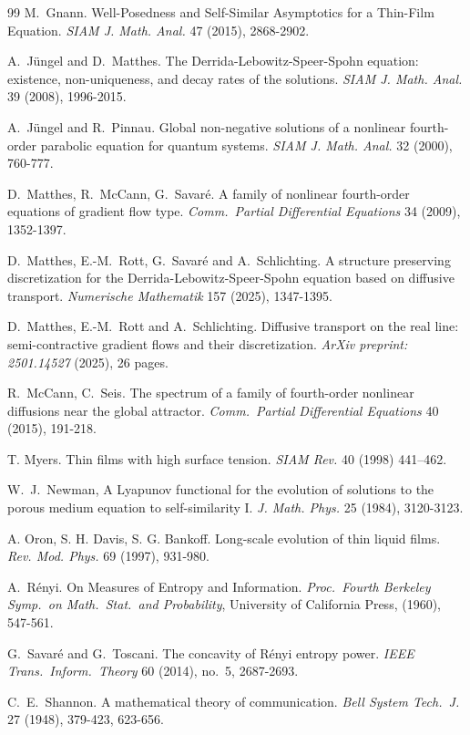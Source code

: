 \documentclass[12pt]{amsart}
\theoremstyle{plain}
\theoremstyle{definition}
\theoremstyle{remark}
\begin{document}
\begin{thebibliography}{99}
 M.~Gnann. Well-Posedness and Self-Similar Asymptotics for a Thin-Film Equation. {\em SIAM J. Math. Anal.} 47 (2015), 2868-2902.

 A.~J\"ungel and D.~Matthes. The Derrida-Lebowitz-Speer-Spohn equation: existence, non-uniqueness, and decay rates of the solutions. {\em SIAM J. Math. Anal.} 39 (2008), 1996-2015.

 A.~J\"ungel and R.~Pinnau. Global non-negative solutions of a nonlinear fourth-order parabolic equation for quantum systems. {\em SIAM J. Math. Anal.} 32 (2000), 760-777.

 D.~Matthes, R.~McCann, G.~Savar\'e. A family of nonlinear fourth-order equations of gradient flow type. {\em Comm.~Partial Differential Equations} 34 (2009), 1352-1397.

 D.~Matthes, E.-M.~Rott, G.~Savar\'e and A.~Schlichting. A structure preserving discretization for the Derrida-Lebowitz-Speer-Spohn equation based on diffusive transport. {\em Numerische Mathematik} 157 (2025), 1347-1395.

 D.~Matthes, E.-M.~Rott and A.~Schlichting. Diffusive transport on the real line: semi-contractive gradient flows and their discretization. {\em ArXiv preprint: 2501.14527} (2025), 26 pages.

 R.~McCann, C.~Seis. The spectrum of a family of fourth-order nonlinear diffusions near the global attractor. {\em Comm.~Partial Differential Equations} 40 (2015), 191-218.

 T. Myers. Thin films with high surface tension. {\em SIAM Rev.} 40 (1998) 441–462.

 W.~J.~Newman, A Lyapunov functional for the evolution of solutions to the porous medium equation to self-similarity I. {\em J. Math. Phys.} 25 (1984), 3120-3123.

 A. Oron, S. H. Davis, S. G. Bankoff. Long-scale evolution of thin liquid films. {\em Rev. Mod. Phys.} 69 (1997), 931-980.

 A.~R\'enyi. On Measures of Entropy and Information. {\em Proc.~Fourth Berkeley Symp.~on Math.~Stat.~and Probability}, University of California Press, (1960), 547-561.

 G.~Savar\'e and G.~Toscani. The concavity of R\'enyi entropy power. {\em IEEE Trans.~Inform.~Theory} 60 (2014), no.~5, 2687-2693.

 C.~E.~Shannon. A mathematical theory of communication. {\em Bell System Tech.~J.} 27 (1948), 379-423, 623-656.


\end{thebibliography}
\end{document}
